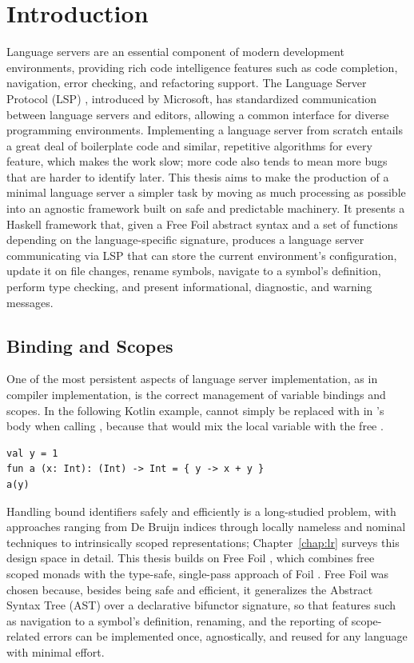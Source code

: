 \chapter{Introduction}
\label{chap:intro}

Language servers are an essential component of modern development environments, providing rich code intelligence features such as code completion, navigation, error checking, and refactoring support. 
The Language Server Protocol (LSP) \cite{lsp}, introduced by Microsoft, has standardized communication between language servers and editors, allowing a common interface for diverse programming environments. 
Implementing a language server from scratch entails a great deal of boilerplate code and similar, repetitive algorithms for every feature, which makes the work slow; more code also tends to mean more bugs that are harder to identify later.
This thesis aims to make the production of a minimal language server a simpler task by moving as much processing as possible into an agnostic framework built on safe and predictable machinery.
It presents a Haskell framework that, given a Free Foil abstract syntax and a set of functions depending on the language-specific signature, produces a language server communicating via LSP that can store the current environment's configuration, update it on file changes, rename symbols, navigate to a symbol's definition, perform type checking, and present informational, diagnostic, and warning messages.

\section{Binding and Scopes}
\label{sec:bindings-and-scopes}

One of the most persistent aspects of language server implementation, as in compiler implementation, is the correct management of variable bindings and scopes. 
In the following Kotlin example,  cannot simply be replaced with  in 's body when calling , because that would mix the local variable  with the free .

\begin{verbatim}
val y = 1
fun a (x: Int): (Int) -> Int = { y -> x + y }
a(y)
\end{verbatim}

Handling bound identifiers safely and efficiently is a long-studied problem, with approaches ranging from De Bruijn indices \cite{deBruijn1972} through locally nameless and nominal techniques to intrinsically scoped representations; Chapter~\ref{chap:lr} surveys this design space in detail. 
This thesis builds on Free Foil \cite{freefoil2024}, which combines free scoped monads \cite{freemonads2024} with the type-safe, single-pass approach of Foil \cite{foil2023}. 
Free Foil was chosen because, besides being safe and efficient, it generalizes the Abstract Syntax Tree (AST) over a declarative bifunctor signature, so that features such as navigation to a symbol's definition, renaming, and the reporting of scope-related errors can be implemented once, agnostically, and reused for any language with minimal effort.

